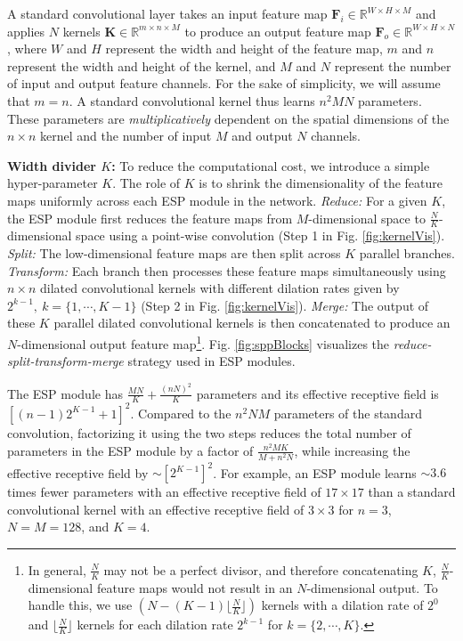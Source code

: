 \documentclass[runningheads]{llncs}
\def\Fig{Fig. }
\begin{document}
A standard convolutional layer takes an input feature map $\mathbf{F}_i \in \mathbb{R}^{W \times H \times M}$ and applies $N$ kernels $\mathbf{K} \in \mathbb{R}^{m \times n\times M}$ to produce an output feature map $\mathbf{F}_o \in \mathbb{R}^{W \times H \times N}$, where $W$ and $H$ represent the width and height of the feature map, $m$ and $n$ represent the width and height of the kernel, and $M$ and $N$ represent the number of input and output feature channels. For the sake of simplicity, we will assume that $m=n$. A standard convolutional kernel thus learns $n^2MN$ parameters. These parameters are \textit{multiplicatively} dependent on the spatial dimensions of the $n \times n$ kernel and the number of input $M$ and output $N$ channels. 

\noindent \textbf{Width divider $K$:} To reduce the computational cost, we introduce a simple hyper-parameter $K$. The role of $K$ is to shrink the dimensionality of the feature maps uniformly across each ESP module in the network. \textit{Reduce:} For a given $K$, the ESP module first reduces the feature maps from $M$-dimensional space to $\frac{N}{K}$-dimensional space using a point-wise convolution (Step 1 in \Fig \ref{fig:kernelVis}). \textit{Split:} The low-dimensional feature maps are then split across $K$ parallel branches. \textit{Transform:} Each branch then processes these feature maps simultaneously using $n\times n$ dilated convolutional kernels with different dilation rates given by $2^{k-1},\  k=\{1, \cdots, K-1\}$ (Step 2 in \Fig \ref{fig:kernelVis}). \textit{Merge:} The output of these $K$ parallel dilated convolutional kernels is then concatenated to produce an $N$-dimensional output feature map\footnote{In general, $\frac{N}{K}$ may not be a perfect divisor, and therefore concatenating $K$, $\frac{N}{K}$-dimensional feature maps would not result in an $N$-dimensional output. To handle this, we use $\left(N - (K - 1) \lfloor\frac{N}{K}\rfloor\right)$ kernels with a dilation rate of $2^0$ and $\lfloor\frac{N}{K}\rfloor$ kernels for each dilation rate $2^{k-1}$ for $k=\{2, \cdots, K\}$.}. \Fig \ref{fig:sppBlocks} visualizes the \textit{reduce-split-transform-merge} strategy used in ESP modules.

The ESP module has $\frac{MN}{K} + \frac{(nN)^2}{K}$ parameters and its effective receptive field is $\left[ (n-1) 2^{K-1} + 1\right]^2$. Compared to the $n^2NM$ parameters of the standard convolution,  factorizing it using the two steps reduces the total number of parameters in the ESP module by a factor of $\frac{n^2 M K}{M + n^2 N}$, while increasing the effective receptive field by $\sim [2^{K-1}]^2$. For example, an ESP module learns $\sim 3.6$ times fewer parameters with an effective receptive field of $17 \times 17$ than a standard convolutional kernel with an effective receptive field of $3 \times 3$ for $n=3$, $N=M=128$, and $K=4$.
\end{document}

